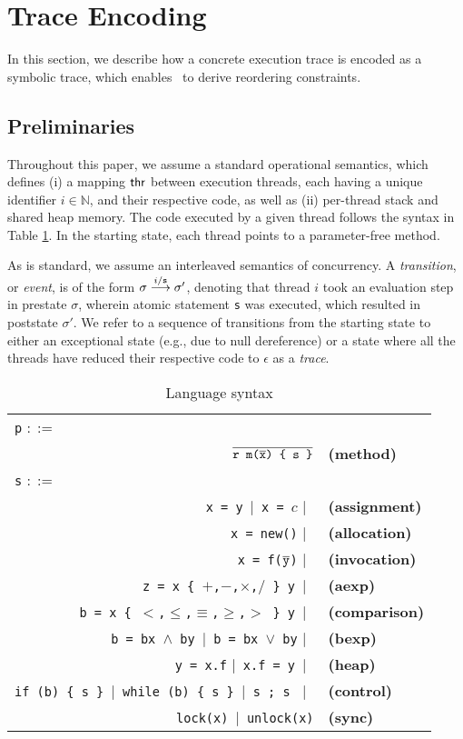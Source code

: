 \section{Trace Encoding}

In this section, we describe how a concrete execution trace is encoded as a symbolic trace, which enables \tool\ to 
derive reordering constraints.

\subsection{Preliminaries}

Throughout this paper, we assume a standard operational semantics, which defines (i) a mapping ${\sf thr}$ between
execution threads, each having a unique identifier $i \in \mathbb{N}$, and their respective code, as well as (ii) per-thread stack and shared heap memory. The code executed by a given thread follows the syntax in Table \ref{Ta:syntax}. In the starting state, each thread points to a parameter-free method.

As is standard, we assume an interleaved semantics of concurrency. A \emph{transition}, or \emph{event}, is of the form
$\sigma \stackrel{i / {\tt s}}{\longrightarrow} \sigma'$, denoting that thread $i$ took an evaluation step
in prestate $\sigma$, wherein atomic
statement {\tt s} was executed, which resulted in poststate $\sigma'$. We refer to a sequence of transitions from
the starting state to either an exceptional state (e.g., due to null dereference) or a state where all the threads have 
reduced their respective code to $\epsilon$ as a \emph{trace}.

\begin{table}
	\begin{center}
	\begin{tabular}{rl}
						\multicolumn{1}{l}{{\tt p} $::=$} & \\
					    $\overline{\texttt{r m($\overline{{\tt x}}$) \{ s \}}}$ & {\bf (method)} \\
						\multicolumn{1}{l}{{\tt s} $::=$} & \\
						{\tt x = y}\ $|$\ {\tt x = $c$} $|$\ & {\bf (assignment)} \\
						{\tt x = new()} $|$\ & {\bf (allocation)} \\
						{\tt x = f($\overline{{\tt y}}$)} $|$\ & {\bf (invocation)} \\
						{\tt z = x \{ $+$,$-$,$\times$,$/$ \} y}\ $|$\ & {\bf (aexp)} \\
						{\tt b = x \{ $<$,$\leq$,$\equiv$,$\geq$,$>$ \} y}\ $|$\ & {\bf (comparison)} \\
						{\tt b = bx $\wedge$ by}\ $|$\ {\tt b = bx $\vee$ by} $|$\ & {\bf (bexp)} \\
						{\tt y = x.f} $|$\ {\tt x.f = y}\ $|$\ & {\bf (heap)} \\
						{\tt if (b) \{ s \} $|$\ {\tt while (b) \{  s \}} $|$\ {\tt s ; s }} $|$\ & {\bf (control)} \\
						{\tt lock(x)}\ $|$\ {\tt unlock(x)} & {\bf (sync)}
	\end{tabular}
	\end{center}
	\caption{\label{Ta:syntax}Language syntax}
\end{table}

